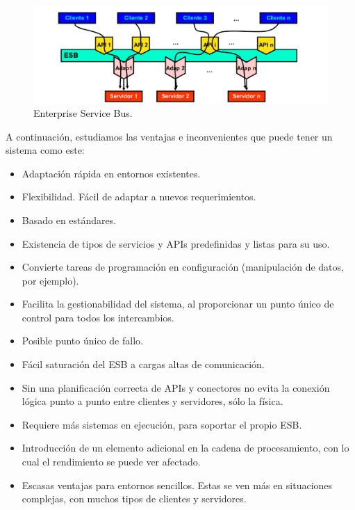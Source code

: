 \documentclass{apuntes}[nochap]
\begin{document}
\begin{figure}[hbtp]
\centering
\includegraphics[width=1\textwidth]{img/ESB.png}
\caption{Enterprise Service Bus.}
\label{ESB}
\end{figure}

A continuación, estudiamos las ventajas e inconvenientes que puede tener un sistema como este:
\begin{itemize}
\item Adaptación rápida en entornos existentes.
\item Flexibilidad. Fácil de adaptar a nuevos requerimientos.
\item Basado en estándares.
\item Existencia de tipos de servicios y APIs predefinidas y listas para su uso.
\item Convierte tareas de programación en configuración (manipulación de datos, por ejemplo).
\item Facilita la gestionabilidad del sistema, al proporcionar un punto único de control para todos los intercambios.
\end{itemize}
\begin{itemize}
\item Posible punto único de fallo.
\item Fácil saturación del ESB a cargas altas de comunicación.
\item Sin una planificación correcta de APIs y conectores no evita la conexión lógica punto a punto entre clientes y servidores, sólo la física.
\item Requiere más sistemas en ejecución, para soportar el propio ESB.
\item Introducción de un elemento adicional en la cadena de procesamiento, con lo cual el rendimiento se puede ver afectado.
\item Escasas ventajas para entornos sencillos. Estas se ven más en situaciones complejas, con muchos tipos de clientes y servidores.
\end{itemize}
\end{document}
